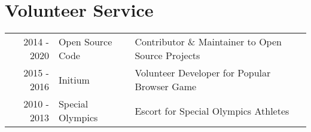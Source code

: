 \documentclass[]{resume}
\begin{document}
\begin{minipage}[t]{0.69\textwidth}
\sectionsep




\section{Volunteer Service}
\begin{tabular}{rll}
2014 - 2020 & Open Source Code  & Contributor \& Maintainer to Open Source Projects \\
2015 - 2016 & Initium           & Volunteer Developer for Popular Browser Game \\
2010 - 2013 & Special Olympics  & Escort for Special Olympics Athletes \\
\end{tabular}


\end{minipage}

%
%

\end{document}
